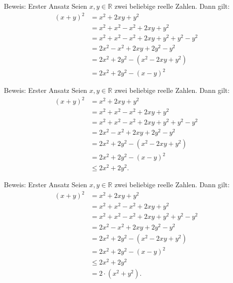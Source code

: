 \documentclass[10pt]{beamer}
\def\bR{\mathbb{R}}
\begin{document}
\begin{frame}{Beweis: Erster Ansatz}
    Seien \( x, y \in \bR \) zwei beliebige reelle Zahlen. Dann gilt:
    \begin{align*}
        \left( x + y \right)^{2}
        & = x^{2} + 2xy + y^{2} \\
        & = x^{2} + x^{2} - x^{2} + 2xy + y^{2} \\
        & = x^{2} + x^{2} - x^{2} + 2xy + y^{2} + y^{2} - y^{2} \\
        & = 2x^{2} - x^{2} + 2xy + 2y^{2} - y^{2} \\
        & = 2x^{2} + 2y^{2} - \left( x^{2} - 2xy + y^{2} \right) \\
        & = 2x^{2} + 2y^{2} - \left( x - y \right)^{2} 
    \end{align*}
\end{frame}



\begin{frame}{Beweis: Erster Ansatz}
    Seien \( x, y \in \bR \) zwei beliebige reelle Zahlen. Dann gilt:
    \begin{align*}
        \left( x + y \right)^{2}
        & = x^{2} + 2xy + y^{2} \\
        & = x^{2} + x^{2} - x^{2} + 2xy + y^{2} \\
        & = x^{2} + x^{2} - x^{2} + 2xy + y^{2} + y^{2} - y^{2} \\
        & = 2x^{2} - x^{2} + 2xy + 2y^{2} - y^{2} \\
        & = 2x^{2} + 2y^{2} - \left( x^{2} - 2xy + y^{2} \right) \\
        & = 2x^{2} + 2y^{2} - \left( x - y \right)^{2} \\
        & \leq 2x^{2} + 2y^{2}.
    \end{align*}
\end{frame}



\begin{frame}{Beweis: Erster Ansatz}
    Seien \( x, y \in \bR \) zwei beliebige reelle Zahlen. Dann gilt:
    \begin{align*}
        \left( x + y \right)^{2}
        & = x^{2} + 2xy + y^{2} \\
        & = x^{2} + x^{2} - x^{2} + 2xy + y^{2} \\
        & = x^{2} + x^{2} - x^{2} + 2xy + y^{2} + y^{2} - y^{2} \\
        & = 2x^{2} - x^{2} + 2xy + 2y^{2} - y^{2} \\
        & = 2x^{2} + 2y^{2} - \left( x^{2} - 2xy + y^{2} \right) \\
        & = 2x^{2} + 2y^{2} - \left( x - y \right)^{2} \\
        & \leq 2x^{2} + 2y^{2} \\
        & = 2 \cdot \left( x^{2} + y^{2} \right).
    \end{align*}
\end{frame}
\end{document}
